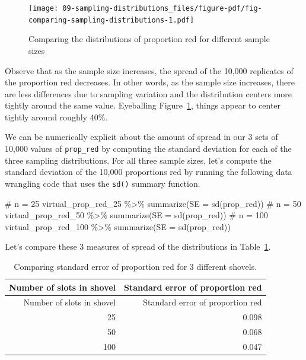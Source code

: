 \documentclass[
  letterpaper,
  DIV=11,
  numbers=noendperiod]{scrreprt}
\newenvironment{Shaded}{\begin{snugshade}}{\end{snugshade}}
\newcommand{\AttributeTok}[1]{\textcolor[rgb]{0.40,0.45,0.13}{#1}}
\newcommand{\CommentTok}[1]{\textcolor[rgb]{0.37,0.37,0.37}{#1}}
\newcommand{\FunctionTok}[1]{\textcolor[rgb]{0.28,0.35,0.67}{#1}}
\newcommand{\NormalTok}[1]{\textcolor[rgb]{0.00,0.23,0.31}{#1}}
\newcommand{\SpecialCharTok}[1]{\textcolor[rgb]{0.37,0.37,0.37}{#1}}
\theoremstyle{definition}
\theoremstyle{remark}
\begin{document}
\begin{figure}

{\centering \texttt{[image: 09-sampling-distributions\_files/figure-pdf/fig-comparing-sampling-distributions-1.pdf]}

}

\caption{\label{fig-comparing-sampling-distributions}Comparing the
distributions of proportion red for different sample sizes}

\end{figure}

Observe that as the sample size increases, the spread of the 10,000
replicates of the proportion red decreases. In other words, as the
sample size increases, there are less differences due to sampling
variation and the distribution centers more tightly around the same
value. Eyeballing Figure~\ref{fig-comparing-sampling-distributions},
things appear to center tightly around roughly 40\%.

We can be numerically explicit about the amount of spread in our 3 sets
of 10,000 values of \texttt{prop\_red} by computing the standard
deviation for each of the three sampling distributions. For all three
sample sizes, let's compute the standard deviation of the 10,000
proportions red by running the following data wrangling code that uses
the \texttt{sd()} summary function.

\begin{Shaded}
\begin{Highlighting}[]
\CommentTok{\# n = 25}
\NormalTok{virtual\_prop\_red\_25 }\SpecialCharTok{\%\textgreater{}\%} 
  \FunctionTok{summarize}\NormalTok{(}\AttributeTok{SE =} \FunctionTok{sd}\NormalTok{(prop\_red))}
\CommentTok{\# n = 50}
\NormalTok{virtual\_prop\_red\_50 }\SpecialCharTok{\%\textgreater{}\%} 
  \FunctionTok{summarize}\NormalTok{(}\AttributeTok{SE =} \FunctionTok{sd}\NormalTok{(prop\_red))}
\CommentTok{\# n = 100}
\NormalTok{virtual\_prop\_red\_100 }\SpecialCharTok{\%\textgreater{}\%} 
  \FunctionTok{summarize}\NormalTok{(}\AttributeTok{SE =} \FunctionTok{sd}\NormalTok{(prop\_red))}
\end{Highlighting}
\end{Shaded}

Let's compare these 3 measures of spread of the distributions in
Table~\ref{tbl-comparing-n}.

\hypertarget{tbl-comparing-n}{}
\begin{longtable}[]{@{}rr@{}}
\caption{\label{tbl-comparing-n}Comparing standard error of proportion
red for 3 different shovels.}\tabularnewline
\toprule()
Number of slots in shovel & Standard error of proportion red \\
\midrule()
\endfirsthead
\toprule()
Number of slots in shovel & Standard error of proportion red \\
\midrule()
\endhead
25 & 0.098 \\
50 & 0.068 \\
100 & 0.047 \\
\bottomrule()
\end{longtable}
\end{document}
